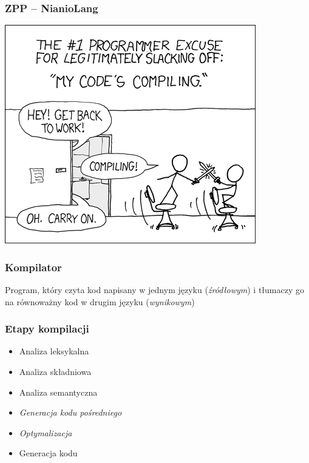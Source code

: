 \documentclass{beamer}
\begin{document}
	\begin{frame}
		\frametitle{ZPP -- NianioLang}
		
		
		\vspace{1em}
		\includegraphics[height=.6\textheight]{compiling.png}
	\end{frame}
	
	\begin{frame}
		\frametitle{Kompilator}
		Program, który czyta kod napisany w jednym języku (\textit{źródłowym})
		i tłumaczy go na równoważny kod w drugim języku (\textit{wynikowym})
	\end{frame}
	
	\begin{frame}
		\frametitle{Etapy kompilacji}
		\begin{itemize}
			\item Analiza leksykalna
			\item Analiza składniowa
			\item Analiza semantyczna
			\item \textit{Generacja kodu pośredniego}
			\item \textit{Optymalizacja}
			\item Generacja kodu
		\end{itemize}
	\end{frame}
	
\end{document}
